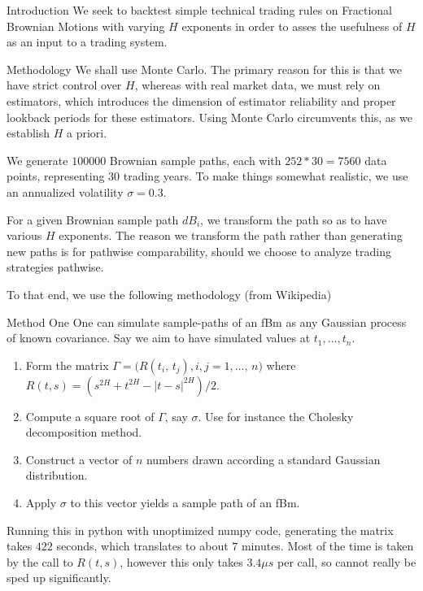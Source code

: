\documentclass[12pt]{article}
\theoremstyle{definition}
\numberwithin{equation}{section}
\numberwithin{example}{section}
\begin{document}
\begin{section}{Introduction}
	We seek to backtest simple technical trading rules on Fractional Brownian
	Motions with varying $H$ exponents in order to asses the usefulness of
	$H$ as an input to a trading system.
\end{section}

\begin{section}{Methodology}
	We shall use Monte Carlo. The primary reason for this is that
	we have strict control over $H$, whereas with real market data, we must rely
	on estimators, which introduces the dimension of estimator reliability
	and proper lookback periods for these estimators. Using Monte Carlo
	circumvents this, as we establish $H$ a priori.

	We generate $100000$ Brownian sample paths, each with $252*30=7560$
	data points, representing $30$ trading years. To make things somewhat
	realistic, we use	an annualized volatility $\sigma = 0.3$.

	For a given Brownian sample path ${dB}_i$, we transform the path so as
	to have	various $H$ exponents. The reason we transform the path rather than
	generating new paths is for pathwise comparability, should we choose to
	analyze trading strategies pathwise.

	To that end, we use the following methodology (from Wikipedia)
	\begin{subsection}{Method One}
		One can simulate sample-paths of an fBm as any Gaussian process 
		of known covariance. Say we aim to have simulated values at
		$t_1, \ldots, t_n$.
		\begin{enumerate}
			\item Form the matrix $\Gamma=\bigl(R(t_i,\, t_j), i,j=1,\ldots,\, n\bigr)$
				where $R(t,s)=(s^{2H}+t^{2H}-|t-s|^{2H})/2$.
			\item Compute a square root of $\Gamma$, say $\sigma$. Use for instance
				the Cholesky decomposition method.
			\item Construct a vector of $n$ numbers drawn according a standard
				Gaussian distribution.
			\item Apply $\sigma$ to this vector yields a sample path of an fBm.
		\end{enumerate}

		Running this in python with unoptimized numpy code, generating the matrix
		takes $422$ seconds, which translates to about $7$ minutes. Most of the
		time is taken by the call to $R(t,s)$, however this only takes
		$3.4 \mu s$ per call, so cannot really be sped up significantly.
	\end{subsection}
\end{section}
\end{document}
